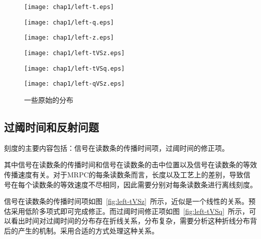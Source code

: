 \begin{figure}[htbp]
\begin{minipage}[t]{0.33\linewidth}
\texttt{[image: chap1/left-t.eps]}
\label{fig:left-t}
\end{minipage}%
\hfill
\begin{minipage}[t]{0.33\linewidth}
\texttt{[image: chap1/left-q.eps]}
\label{fig:left-q}
\end{minipage}
\hfill
\begin{minipage}[t]{0.33\linewidth}
\texttt{[image: chap1/left-z.eps]}
\label{fig:left-z}
\end{minipage}
\vfill
\begin{minipage}[t]{0.33\linewidth}
\texttt{[image: chap1/left-tVSz.eps]}
\label{fig:left-tVSz}
\end{minipage}%
\hfill
\begin{minipage}[t]{0.33\linewidth}
\texttt{[image: chap1/left-tVSq.eps]}
\label{fig:left-tVSq}
\end{minipage}
\hfill
\begin{minipage}[t]{0.33\linewidth}
\texttt{[image: chap1/left-qVSz.eps]}
\label{fig:left-qVSz}
\end{minipage}
\caption{一些原始的分布}
\label{fig:some-Diagram}
\end{figure}

\subsection{过阈时间和反射问题}
刻度的主要内容包括：信号在读数条的传播时间项，过阈时间的修正项。

其中信号在读数条的传播时间和信号在读数条的击中位置以及信号在读数条的等效传播速度有关。对于MRPC的每条读数条而言，长度以及工艺上的差别，导致信号在每个读数条的等效速度不尽相同，因此需要分别对每条读数条进行离线刻度。

信号在读数条的传播时间项如图~\ref{fig:left-tVSz}~所示，近似是一个线性的关系。预估采用低阶多项式即可完成修正。而过阈时间修正项如图~\ref{fig:left-tVSq}~所示，可以看出时间对过阈时间的分布存在折线关系，分布复杂，需要分析这种折线分布背后的产生的机制。采用合适的方式处理这种关系。

